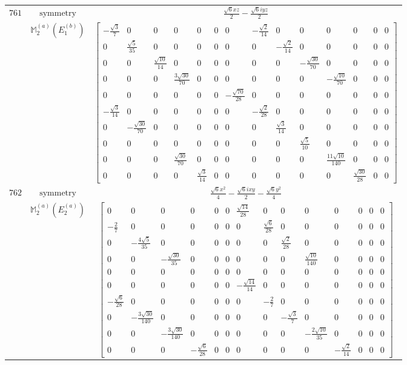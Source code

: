 \documentclass[fleqn,8pt,landscape]{jsarticle}
\begin{document}
\begin{longtable}{ccc}
$ 761 $ & $ \text{symmetry} $ & $ \frac{\sqrt{6} x z}{2} - \frac{\sqrt{6} i y z}{2} $ \\
$  $ & $ \mathbb{M}_{2}^{(a)}(E_{1}^{(b)}) $ & $ \begin{bmatrix} - \frac{\sqrt{3}}{7} & 0 & 0 & 0 & 0 & 0 & 0 & - \frac{\sqrt{2}}{14} & 0 & 0 & 0 & 0 & 0 & 0 \\ 0 & \frac{\sqrt{5}}{35} & 0 & 0 & 0 & 0 & 0 & 0 & - \frac{\sqrt{2}}{14} & 0 & 0 & 0 & 0 & 0 \\ 0 & 0 & \frac{\sqrt{10}}{14} & 0 & 0 & 0 & 0 & 0 & 0 & - \frac{\sqrt{30}}{70} & 0 & 0 & 0 & 0 \\ 0 & 0 & 0 & \frac{3 \sqrt{30}}{70} & 0 & 0 & 0 & 0 & 0 & 0 & - \frac{\sqrt{10}}{70} & 0 & 0 & 0 \\ 0 & 0 & 0 & 0 & 0 & 0 & - \frac{\sqrt{70}}{28} & 0 & 0 & 0 & 0 & 0 & 0 & 0 \\ - \frac{\sqrt{3}}{14} & 0 & 0 & 0 & 0 & 0 & 0 & - \frac{\sqrt{2}}{28} & 0 & 0 & 0 & 0 & 0 & 0 \\ 0 & - \frac{\sqrt{30}}{70} & 0 & 0 & 0 & 0 & 0 & 0 & \frac{\sqrt{3}}{14} & 0 & 0 & 0 & 0 & 0 \\ 0 & 0 & 0 & 0 & 0 & 0 & 0 & 0 & 0 & \frac{\sqrt{5}}{10} & 0 & 0 & 0 & 0 \\ 0 & 0 & 0 & \frac{\sqrt{30}}{70} & 0 & 0 & 0 & 0 & 0 & 0 & \frac{11 \sqrt{10}}{140} & 0 & 0 & 0 \\ 0 & 0 & 0 & 0 & \frac{\sqrt{3}}{14} & 0 & 0 & 0 & 0 & 0 & 0 & \frac{\sqrt{30}}{28} & 0 & 0 \end{bmatrix} $ \\ \hline
$ 762 $ & $ \text{symmetry} $ & $ \frac{\sqrt{6} x^{2}}{4} - \frac{\sqrt{6} i x y}{2} - \frac{\sqrt{6} y^{2}}{4} $ \\
$  $ & $ \mathbb{M}_{2}^{(a)}(E_{2}^{(a)}) $ & $ \begin{bmatrix} 0 & 0 & 0 & 0 & 0 & 0 & \frac{\sqrt{14}}{28} & 0 & 0 & 0 & 0 & 0 & 0 & 0 \\ - \frac{2}{7} & 0 & 0 & 0 & 0 & 0 & 0 & \frac{\sqrt{6}}{28} & 0 & 0 & 0 & 0 & 0 & 0 \\ 0 & - \frac{4 \sqrt{5}}{35} & 0 & 0 & 0 & 0 & 0 & 0 & \frac{\sqrt{2}}{28} & 0 & 0 & 0 & 0 & 0 \\ 0 & 0 & - \frac{\sqrt{30}}{35} & 0 & 0 & 0 & 0 & 0 & 0 & \frac{\sqrt{10}}{140} & 0 & 0 & 0 & 0 \\ 0 & 0 & 0 & 0 & 0 & 0 & 0 & 0 & 0 & 0 & 0 & 0 & 0 & 0 \\ 0 & 0 & 0 & 0 & 0 & 0 & - \frac{\sqrt{14}}{14} & 0 & 0 & 0 & 0 & 0 & 0 & 0 \\ - \frac{\sqrt{6}}{28} & 0 & 0 & 0 & 0 & 0 & 0 & - \frac{2}{7} & 0 & 0 & 0 & 0 & 0 & 0 \\ 0 & - \frac{3 \sqrt{30}}{140} & 0 & 0 & 0 & 0 & 0 & 0 & - \frac{\sqrt{3}}{7} & 0 & 0 & 0 & 0 & 0 \\ 0 & 0 & - \frac{3 \sqrt{30}}{140} & 0 & 0 & 0 & 0 & 0 & 0 & - \frac{2 \sqrt{10}}{35} & 0 & 0 & 0 & 0 \\ 0 & 0 & 0 & - \frac{\sqrt{6}}{28} & 0 & 0 & 0 & 0 & 0 & 0 & - \frac{\sqrt{2}}{14} & 0 & 0 & 0 \end{bmatrix} $ \\ \hline

\end{longtable}
\end{document}

